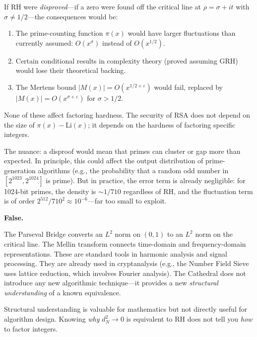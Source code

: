 \documentclass[11pt,a4paper]{article}
\begin{document}
If RH were \emph{disproved}---if a zero were found off the critical
line at $\rho = \sigma + it$ with $\sigma \neq 1/2$---the
consequences would be:

\begin{enumerate}
  \item The prime-counting function $\pi(x)$ would have larger
    fluctuations than currently assumed: $O(x^\sigma)$ instead
    of $O(x^{1/2})$.
  \item Certain conditional results in complexity theory (proved
    assuming GRH) would lose their theoretical backing.
  \item The Mertens bound $|M(x)| = O(x^{1/2+\varepsilon})$ would
    fail, replaced by $|M(x)| = O(x^{\sigma + \varepsilon})$ for
    $\sigma > 1/2$.
\end{enumerate}

None of these affect factoring hardness. The security of RSA does
not depend on the size of $\pi(x) - \text{Li}(x)$; it depends on
the hardness of factoring specific integers.

The nuance: a disproof would mean that primes can cluster or gap
more than expected. In principle, this could affect the output
distribution of prime-generation algorithms (e.g., the probability
that a random odd number in $[2^{1023}, 2^{1024}]$ is prime). But
in practice, the error term is already negligible: for 1024-bit
primes, the density is $\sim 1/710$ regardless of RH, and the
fluctuation term is of order $2^{512}/710^2 \approx 10^{-6}$---far
too small to exploit.

\begin{myth}
\label{myth:technique}
\textbf{False.}
\end{myth}

The Parseval Bridge converts an $L^2$ norm on $(0,1)$ to an $L^2$
norm on the critical line. The Mellin transform connects time-domain
and frequency-domain representations. These are standard tools in
harmonic analysis and signal processing. They are already used in
cryptanalysis (e.g., the Number Field Sieve uses lattice reduction,
which involves Fourier analysis). The Cathedral does not introduce
any new algorithmic technique---it provides a new \emph{structural
understanding} of a known equivalence.

Structural understanding is valuable for mathematics but not
directly useful for algorithm design. Knowing \emph{why} $d_N^2 \to 0$
is equivalent to RH does not tell you \emph{how} to factor integers.
\end{document}
